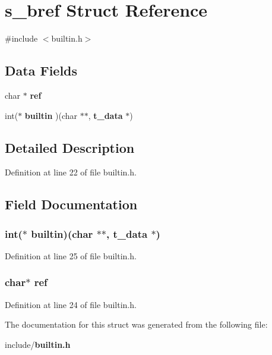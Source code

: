 \section{s\-\_\-bref Struct Reference}
\label{structs__bref}


{\ttfamily \#include $<$builtin.\-h$>$}

\subsection*{Data Fields}
\begin{DoxyCompactItemize}
\item 
char $\ast$ {\bf ref}
\item 
int($\ast$ {\bf builtin} )(char $\ast$$\ast$, {\bf t\-\_\-data} $\ast$)
\end{DoxyCompactItemize}


\subsection{Detailed Description}


Definition at line 22 of file builtin.\-h.



\subsection{Field Documentation}
\subsubsection[{builtin}]{\setlength{\rightskip}{0pt plus 5cm}int($\ast$ builtin)(char $\ast$$\ast$, {\bf t\-\_\-data} $\ast$)}\label{structs__bref_a3cffecc657840bcfdbd40bfaf96be9d5}


Definition at line 25 of file builtin.\-h.

\subsubsection[{ref}]{\setlength{\rightskip}{0pt plus 5cm}char$\ast$ ref}\label{structs__bref_a409d98460fccb0c31bf8887117e68f36}


Definition at line 24 of file builtin.\-h.



The documentation for this struct was generated from the following file\-:\begin{DoxyCompactItemize}
\item 
include/{\bf builtin.\-h}\end{DoxyCompactItemize}
